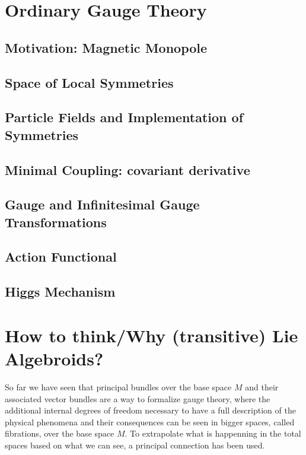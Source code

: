 \section{Ordinary Gauge Theory}
\subsection{Motivation: Magnetic Monopole}

\subsection{Space of Local Symmetries}

\subsection{Particle Fields and Implementation of Symmetries}

\subsection{Minimal Coupling: covariant derivative}

\subsection{Gauge and Infinitesimal Gauge Transformations}

\subsection{Action Functional}

\subsection{Higgs Mechanism}

\section{How to think/Why (transitive) Lie Algebroids?}

So far we have seen that principal bundles over the base space $M$ and their associated vector bundles are a way to formalize gauge theory, where the additional internal degrees of freedom necessary to have a full description of the physical phenomena and their consequences can be seen in bigger spaces, called fibrations, over the base space $M$. To extrapolate what is happenning in the total spaces based on what we can see, a principal connection has been used. 

